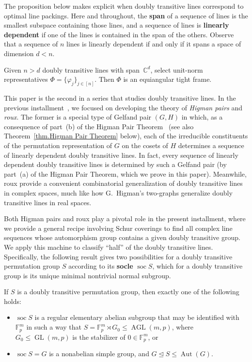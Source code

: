 The proposition below makes explicit when doubly transitive lines correspond to optimal line packings.
Here and throughout, the \textbf{span} of a sequence of lines is the smallest subspace containing those lines, and a sequence of lines is \textbf{linearly dependent} if one of the lines is contained in the span of the others.
Observe that a sequence of $n$ lines is linearly dependent if and only if it spans a space of dimension $d < n$.


\begin{proposition}
\label{prop: 2tran implies ETF}
Given $n >d$ doubly transitive lines with span~$\mathbb{C}^d$, select unit-norm representatives $\Phi = \{\varphi_j\}_{j\in[n]}$.
Then $\Phi$ is an equiangular tight frame.
\end{proposition}

This paper is the second in a series that studies doubly transitive lines.
In the previous installment~\cite{IversonM:18}, we focused on developing the theory of \textit{Higman pairs} and \textit{roux}.
The former is a special type of Gelfand pair $(G,H)$ in which, as a consequence of part~(b) of the Higman Pair Theorem~\cite{IversonM:18} (see also Theorem~\ref{thm.Higman Pair Theorem} below), each of the irreducible constituents of the permutation representation of $G$ on the cosets of $H$ determines a sequence of linearly dependent doubly transitive lines.
In fact, every sequence of linearly dependent doubly transitive lines is determined by such a Gelfand pair (by part~(a) of the Higman Pair Theorem, which we prove in this paper).
Meanwhile, roux provide a convenient combinatorial generalization of doubly transitive lines in complex spaces, much like how G.~Higman's two-graphs generalize doubly transitive lines in real spaces.

Both Higman pairs and roux play a pivotal role in the present installment, where we provide a general recipe involving Schur coverings to find all complex line sequences whose automorphism group contains a given doubly transitive group.
We apply this machine to classify ``half'' of the doubly transitive lines.
Specifically, the following result gives two possibilities for a doubly transitive permutation group $S$ according to its \textbf{socle} $\operatorname{soc} S$, which for a doubly transitive group is its unique minimal nontrivial normal subgroup.

\begin{proposition}
\label{prop: Burnside}
If $S$ is a doubly transitive permutation group, then exactly one of the following holds:
\begin{itemize}
\item[(I)]
$\operatorname{soc} S$ is a regular elementary abelian subgroup that may be identified with $\mathbb{F}_p^m$ in such a way that $S = \mathbb{F}_p^m \rtimes G_0 \leq \operatorname{AGL}(m,p)$, where $G_0 \leq \operatorname{GL}(m,p)$ is the stabilizer of $0 \in \mathbb{F}_p^m$, or
\item[(II)]
$\operatorname{soc} S = G$ is a nonabelian simple group, and $G\unlhd S\leq\operatorname{Aut}(G)$.
\end{itemize}
\end{proposition}

